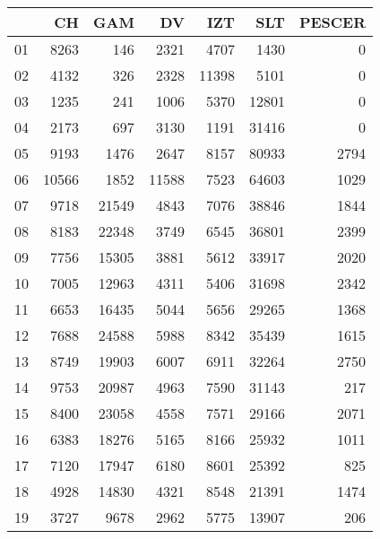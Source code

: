 \documentclass[12pt]{article}
\begin{document}
\begin{table}[ht]
\centering
\begin{tabular}{rrrrrrr}
  \hline
 & CH & GAM & DV & IZT & SLT & PESCER \\ 
  \hline
01 & 8263 & 146 & 2321 & 4707 & 1430 &   0 \\ 
  02 & 4132 & 326 & 2328 & 11398 & 5101 &   0 \\ 
  03 & 1235 & 241 & 1006 & 5370 & 12801 &   0 \\ 
  04 & 2173 & 697 & 3130 & 1191 & 31416 &   0 \\ 
  05 & 9193 & 1476 & 2647 & 8157 & 80933 & 2794 \\ 
  06 & 10566 & 1852 & 11588 & 7523 & 64603 & 1029 \\ 
  07 & 9718 & 21549 & 4843 & 7076 & 38846 & 1844 \\ 
  08 & 8183 & 22348 & 3749 & 6545 & 36801 & 2399 \\ 
  09 & 7756 & 15305 & 3881 & 5612 & 33917 & 2020 \\ 
  10 & 7005 & 12963 & 4311 & 5406 & 31698 & 2342 \\ 
  11 & 6653 & 16435 & 5044 & 5656 & 29265 & 1368 \\ 
  12 & 7688 & 24588 & 5988 & 8342 & 35439 & 1615 \\ 
  13 & 8749 & 19903 & 6007 & 6911 & 32264 & 2750 \\ 
  14 & 9753 & 20987 & 4963 & 7590 & 31143 & 217 \\ 
  15 & 8400 & 23058 & 4558 & 7571 & 29166 & 2071 \\ 
  16 & 6383 & 18276 & 5165 & 8166 & 25932 & 1011 \\ 
  17 & 7120 & 17947 & 6180 & 8601 & 25392 & 825 \\ 
  18 & 4928 & 14830 & 4321 & 8548 & 21391 & 1474 \\ 
  19 & 3727 & 9678 & 2962 & 5775 & 13907 & 206 \\ 
   \hline
\end{tabular}
\end{table}
\end{document}
